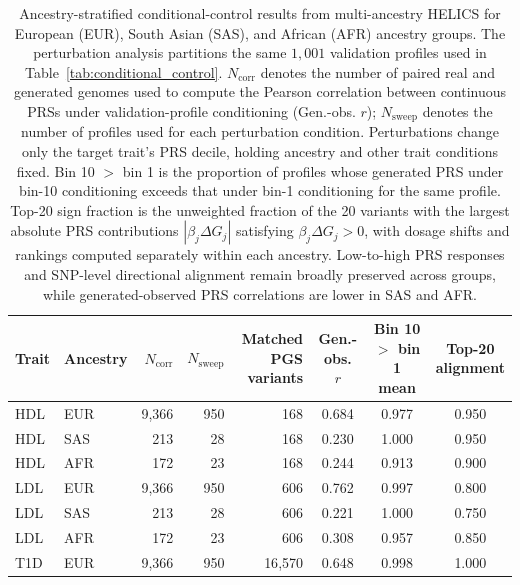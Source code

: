 \documentclass{article}
\begin{document}
\begin{table}[t]
\centering
\caption{Ancestry-stratified conditional-control results from multi-ancestry HELICS for European (EUR), South Asian (SAS), and African (AFR) ancestry groups. The perturbation analysis partitions the same \(1{,}001\) validation profiles used in Table~\ref{tab:conditional_control}. \(N_{\mathrm{corr}}\) denotes the number of paired real and generated genomes used to compute the Pearson correlation between continuous PRSs under validation-profile conditioning (Gen.-obs. \(r\)); \(N_{\mathrm{sweep}}\) denotes the number of profiles used for each perturbation condition. Perturbations change only the target trait's PRS decile, holding ancestry and other trait conditions fixed. Bin 10 \(>\) bin 1 is the proportion of profiles whose generated PRS under bin-10 conditioning exceeds that under bin-1 conditioning for the same profile. Top-20 sign fraction is the unweighted fraction of the 20 variants with the largest absolute PRS contributions \(|\beta_j\Delta G_j|\) satisfying \(\beta_j\Delta G_j>0\), with dosage shifts and rankings computed separately within each ancestry. Low-to-high PRS responses and SNP-level directional alignment remain broadly preserved across groups, while generated-observed PRS correlations are lower in SAS and AFR.}
\label{tab:conditional_control_ancestry}
\small
\setlength{\tabcolsep}{3pt}
\renewcommand{\arraystretch}{1.05}
\begin{tabular}{llrrrccc}
\toprule
Trait & Ancestry
& \(N_{\mathrm{corr}}\)
& \(N_{\mathrm{sweep}}\)
& \shortstack{Matched\\PGS variants}
& \shortstack{Gen.-obs.\\\(r\)}
& \shortstack{Bin 10 \(>\)\\bin 1 mean}
& \shortstack{Top-20\\alignment} \\
\midrule
HDL & EUR & 9{,}366 & 950 & 168 & 0.684 & 0.977 & 0.950 \\
HDL & SAS & 213 & 28 & 168 & 0.230 & 1.000 & 0.950 \\
HDL & AFR & 172 & 23 & 168 & 0.244 & 0.913 & 0.900 \\
\midrule
LDL & EUR & 9{,}366 & 950 & 606 & 0.762 & 0.997 & 0.800 \\
LDL & SAS & 213 & 28 & 606 & 0.221 & 1.000 & 0.750 \\
LDL & AFR & 172 & 23 & 606 & 0.308 & 0.957 & 0.850 \\
\midrule
T1D & EUR & 9{,}366 & 950 & 16{,}570 & 0.648 & 0.998 & 1.000 \\

\end{tabular}
\end{table}
\end{document}
